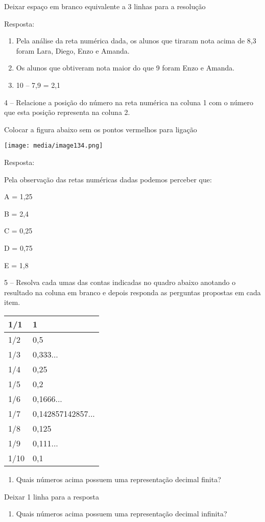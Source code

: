 Deixar espaço em branco equivalente a 3 linhas para a resolução

Resposta:

\begin{enumerate}
\def\labelenumi{\alph{enumi})}
\item
  Pela análise da reta numérica dada, os alunos que tiraram nota acima
  de 8,3 foram Lara, Diego, Enzo e Amanda.
\item
  Os alunos que obtiveram nota maior do que 9 foram Enzo e Amanda.
\item
  10 -- 7,9 = 2,1
\end{enumerate}

4 -- Relacione a posição do número na reta numérica na coluna 1 com o
número que esta posição representa na coluna 2.

Colocar a figura abaixo sem os pontos vermelhos para ligação

\texttt{[image: media/image134.png]}

Resposta:

Pela observação das retas numéricas dadas podemos perceber que:

A = 1,25

B = 2,4

C = 0,25

D = 0,75

E = 1,8

5 -- Resolva cada umas das contas indicadas no quadro abaixo anotando o
resultado na coluna em branco e depois responda as perguntas propostas
em cada item.

\begin{longtable}[]{@{}ll@{}}
\toprule
1/1 & 1\tabularnewline
\midrule
\endhead
1/2 & 0,5\tabularnewline
1/3 & 0,333...\tabularnewline
1/4 & 0,25\tabularnewline
1/5 & 0,2\tabularnewline
1/6 & 0,1666...\tabularnewline
1/7 & 0,142857142857...\tabularnewline
1/8 & 0,125\tabularnewline
1/9 & 0,111...\tabularnewline
1/10 & 0,1\tabularnewline
\bottomrule
\end{longtable}

\begin{enumerate}
\def\labelenumi{\alph{enumi})}
\item
  Quais números acima possuem uma representação decimal finita?
\end{enumerate}

Deixar 1 linha para a resposta

\begin{enumerate}
\def\labelenumi{\alph{enumi})}
\item
  Quais números acima possuem uma representação decimal infinita?
\end{enumerate}

